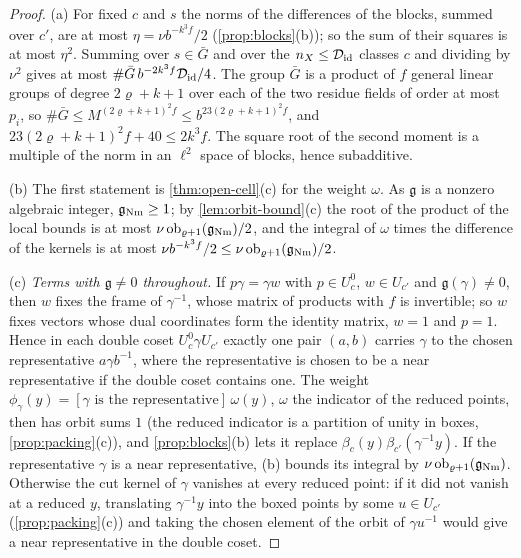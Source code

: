 \begin{proof}
(a) For fixed $c$ and $s$ the norms of the differences of the blocks, summed over $c'$, are at most $\eta=\nu b^{-k^3f}/2$ (\cref{prop:blocks}(b)); so the sum of their squares is at most $\eta^2$. Summing over $s\in\bar G$ and over the
$n_X\le\mathcal D_{\rm id}$ classes $c$ and dividing by $\nu^2$ gives at most $\#\bar G\,b^{-2k^3f}\mathcal D_{\rm id}/4$. The group $\bar G$ is a product of $f$ general linear groups of degree $2\varrho+k+1$ over each of the two residue fields
of order at most $p_i$, so $\#\bar G\le M^{(2\varrho+k+1)^2f}\le b^{23(2\varrho+k+1)^2f}$, and $23(2\varrho+k+1)^2f+40\le2k^3f$. The square root of the second moment is a multiple of the norm in an $\ell^2$ space of blocks, hence
subadditive.

(b) The first statement is \cref{thm:open-cell}(c) for the weight $\omega$. As $\mathfrak g$ is a nonzero algebraic integer, $\mathfrak g_{\rm Nm}\ge1$; by \cref{lem:orbit-bound}(c) the root of the product of the local bounds is
at most $\nu\,\mathrm{ob}_{\varrho+1}(\mathfrak g_{\rm Nm})/2$, and the integral of $\omega$ times the difference of the kernels is at most $\nu b^{-k^3f}/2\le\nu\,\mathrm{ob}_{\varrho+1}(\mathfrak g_{\rm Nm})/2$.

(c) \emph{Terms with $\mathfrak g\ne0$ throughout.} If $p\gamma=\gamma w$ with $p\in U^0_c$, $w\in U_{c'}$ and $\mathfrak g(\gamma)\ne0$, then $w$ fixes the frame of $\gamma^{-1}$, whose matrix of products with $f$ is invertible; so $w$ fixes vectors
whose dual coordinates form the identity matrix, $w=1$ and $p=1$. Hence in each double coset $U^0_c\gamma U_{c'}$ exactly one pair $(a,b)$ carries $\gamma$ to the chosen representative $a\gamma b^{-1}$, where the representative is chosen
to be a near representative if the double coset contains one. The weight $\phi_\gamma(y)=[\gamma\text{ is the representative}]\,\omega(y)$, $\omega$ the indicator of the reduced points, then has orbit sums $1$ (the reduced
indicator is a partition of unity in boxes, \cref{prop:packing}(c)), and \cref{prop:blocks}(b) lets it replace $\beta_c(y)\beta_{c'}(\gamma^{-1}y)$. If the representative $\gamma$ is a near representative, (b) bounds its integral by $\nu\,\mathrm{ob}_{\varrho+1}(\mathfrak g_{\rm Nm})$. Otherwise the cut
kernel of $\gamma$ vanishes at every reduced point: if it did not vanish at a reduced $y$, translating $\gamma^{-1}y$ into the boxed points by some $u\in U_{c'}$ (\cref{prop:packing}(c)) and taking the chosen element of the
orbit of $\gamma u^{-1}$ would give a near representative in the double coset.


\end{proof}
